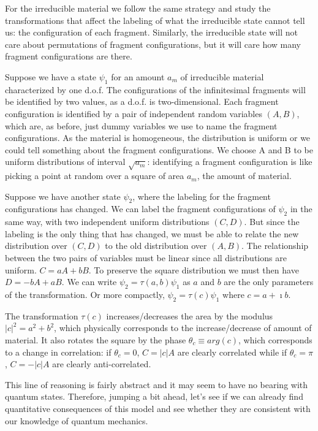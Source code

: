 \documentclass[smallextended]{svjour3}
\numberwithin{equation}{section}
\theoremstyle{definition}
\begin{document}
For the irreducible material we follow the same strategy and study the transformations that affect the labeling of what the irreducible state cannot tell us: the configuration of each fragment. Similarly, the irreducible state will not care about permutations of fragment configurations, but it will care how many fragment configurations are there.

Suppose we have a state $\psi_1$ for an amount $a_m$ of irreducible material characterized by one d.o.f. The configurations of the infinitesimal fragments will be identified by two values, as a d.o.f. is two-dimensional. Each fragment configuration is identified by a pair of independent random variables $(A, B)$, which are, as before, just dummy variables we use to name the fragment configurations. As the material is homogeneous, the distribution is uniform or we could tell something about the fragment configurations. We choose A and B to be uniform distributions of interval $\sqrt{a_m}$: identifying a fragment configuration is like picking a point at random over a square of area $a_m$, the amount of material.

Suppose we have another state $\psi_2$, where the labeling for the fragment configurations has changed. We can label the fragment configurations of $\psi_2$ in the same way, with two independent uniform distributions $(C, D)$. But since the labeling is the only thing that has changed, we must be able to relate the new distribution over $(C,D)$ to the old distribution over $(A,B)$. The relationship between the two pairs of variables must be linear since all distributions are uniform. $C=aA+bB$. To preserve the square distribution we must then have $D= -bA + aB$. We can write $\psi_2 = \tau(a,b) \psi_1$ as $a$ and $b$ are the only parameters of the transformation. Or more compactly, $\psi_2 = \tau(c) \psi_1$ where $c=a+\imath b$.

The transformation $\tau(c)$ increases/decreases the area by the modulus $|c|^2=a^2+b^2$, which physically corresponds to the increase/decrease of amount of material. It also rotates the square by the phase $\theta_c \equiv arg(c)$, which corresponds to a change in correlation: if $\theta_c = 0$, $C = |c| A$ are clearly correlated while if $\theta_c = \pi$, $C = - |c| A$ are clearly anti-correlated.

This line of reasoning is fairly abstract and it may seem to have no bearing with quantum states. Therefore, jumping a bit ahead, let's see if we can already find quantitative consequences of this model and see whether they are consistent with our knowledge of quantum mechanics.
\end{document}
